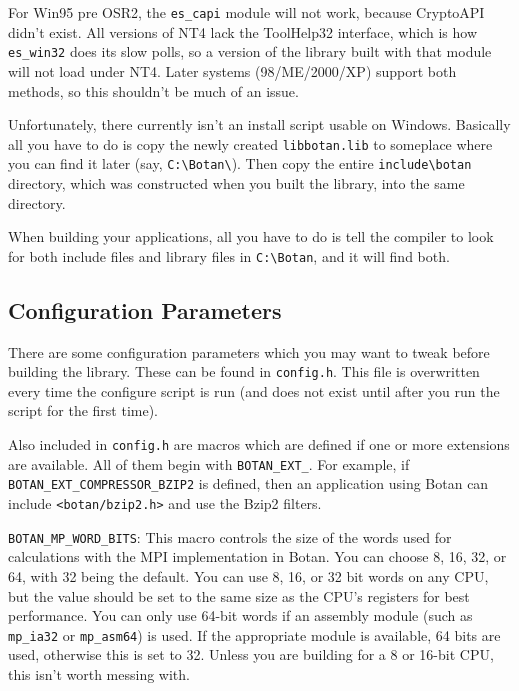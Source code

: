 \documentclass{article}
\newcommand{\filename}[1]{\texttt{#1}}
\newcommand{\module}[1]{\texttt{#1}}
\newcommand{\macro}[1]{\texttt{#1}}
\begin{document}
For Win95 pre OSR2, the \verb|es_capi| module will not work, because
CryptoAPI didn't exist. All versions of NT4 lack the ToolHelp32
interface, which is how \verb|es_win32| does its slow polls, so a
version of the library built with that module will not load under
NT4. Later systems (98/ME/2000/XP) support both methods, so this
shouldn't be much of an issue.

Unfortunately, there currently isn't an install script usable on
Windows. Basically all you have to do is copy the newly created
\filename{libbotan.lib} to someplace where you can find it later (say,
\verb|C:\Botan\|). Then copy the entire \verb|include\botan| directory, which
was constructed when you built the library, into the same directory.

When building your applications, all you have to do is tell the compiler to
look for both include files and library files in \verb|C:\Botan|, and it will
find both.

\pagebreak

\subsection{Configuration Parameters}

There are some configuration parameters which you may want to tweak before
building the library. These can be found in \filename{config.h}. This file is
overwritten every time the configure script is run (and does not exist until
after you run the script for the first time).

Also included in \filename{config.h} are macros which are defined if one or
more extensions are available. All of them begin with \verb|BOTAN_EXT_|. For
example, if \verb|BOTAN_EXT_COMPRESSOR_BZIP2| is defined, then an application
using Botan can include \filename{<botan/bzip2.h>} and use the Bzip2 filters.

\macro{BOTAN\_MP\_WORD\_BITS}: This macro controls the size of the
words used for calculations with the MPI implementation in Botan. You
can choose 8, 16, 32, or 64, with 32 being the default. You can use 8,
16, or 32 bit words on any CPU, but the value should be set to the
same size as the CPU's registers for best performance. You can only
use 64-bit words if an assembly module (such as \module{mp\_ia32} or
\module{mp\_asm64}) is used. If the appropriate module is available,
64 bits are used, otherwise this is set to 32. Unless you are building
for a 8 or 16-bit CPU, this isn't worth messing with.
\end{document}
